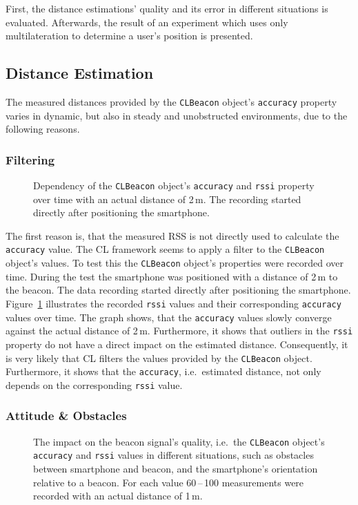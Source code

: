 First, the distance estimations' quality and its error in different situations is evaluated. Afterwards, the result of an experiment which uses only multilateration to determine a user's position is presented.

\subsection{Distance Estimation}
The measured distances provided by the \texttt{CLBeacon} object's \texttt{accuracy} property varies in dynamic, but also in steady and unobstructed environments, due to the following reasons.


\subsubsection*{Filtering}
\begin{figure}[t]
	
	\caption {Dependency of the \texttt{CLBeacon} object's \texttt{accuracy} and \texttt{rssi} property over time with an actual distance of 2\,m. The recording started directly after positioning the smartphone.}
	\label{fig:beacon_eval_accuracy-rssi}
\end{figure}

The first reason is, that the measured \ac{RSS} is not directly used to calculate the \texttt{accuracy} value. The \acl{CL} framework seems to apply a filter to the \texttt{CLBeacon} object's values. To test this the \texttt{CLBeacon} object's properties were recorded over time. During the test the smartphone was positioned with a distance of 2\,m to the beacon. The data recording started directly after positioning the smartphone. Figure~\ref{fig:beacon_eval_accuracy-rssi} illustrates the recorded \texttt{rssi} values and their corresponding \texttt{accuracy} values over time. The graph shows, that the \texttt{accuracy} values slowly converge against the actual distance of 2\,m. Furthermore, it shows that outliers in the \texttt{rssi} property do not have a direct impact on the estimated distance. Consequently, it is very likely that \ac{CL} filters the values provided by the \texttt{CLBeacon} object. Furthermore, it shows that the \texttt{accuracy}, i.e.\ estimated distance, not only depends on the corresponding \texttt{rssi} value.


\subsubsection*{Attitude \& Obstacles}
\begin{figure}[t]
	
	\caption {The impact on the beacon signal's quality, i.e.\ the \texttt{CLBeacon} object's \texttt{accuracy} and \texttt{rssi} values in different situations, such as obstacles between smartphone and beacon, and the smartphone's orientation relative to a beacon. For each value 60\,--\,100 measurements were recorded with an actual distance of 1\,m.}
	\label{fig:beacon_eval_situations}
\end{figure}

